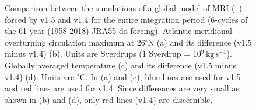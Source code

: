 \documentclass[dvipdfmx]{elsarticle_mod}
\begin{document}
\begin{figure}[h]
\centering
  \caption{Comparison between the simulations of a global model of MRI (\citeauthor{Urakawa_et_al_2020}~\citeyear{Urakawa_et_al_2020}) forced by v1.5 and v1.4 for the entire integration period (6-cycles of the 61-year (1958-2018) JRA55-do forcing). Atlantic meridional overturning circulation maximum at 26$^{\circ}$N (a) and its difference (v1.5 minus v1.4) (b). Units are Sverdrups (1 Sverdrup = 10$^{9}\,\mathrm{kg}\,\mathrm{s}^{-1}$). Globally averaged temperature (c) and its difference (v1.5 minus v1.4) (d). Units are $^{\circ}$C. In (a) and (c), blue lines are used for v1.5 and red lines are used for v1.4. Since differences are very small as shown in (b) and (d), only red lines (v1.4) are discernible.}
  \label{fig:amoc-ts-v1_5-v1_4}
\end{figure}
\end{document}
